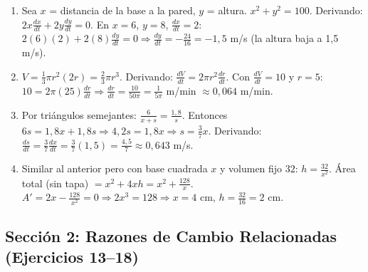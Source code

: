 \documentclass[12pt, letterpaper]{article}
\begin{document}
\begin{enumerate}[series=respuestas, leftmargin=*, label=\textbf{\arabic*.}]
    \item Sea $x$ = distancia de la base a la pared, $y$ = altura. $x^2 + y^2 = 100$. Derivando: $2x\frac{dx}{dt} + 2y\frac{dy}{dt} = 0$. En $x = 6$, $y = 8$, $\frac{dx}{dt} = 2$: $2(6)(2) + 2(8)\frac{dy}{dt} = 0 \Rightarrow \frac{dy}{dt} = -\frac{24}{16} = -1{,}5$ m/s (la altura baja a 1,5 m/s).
    \item $V = \frac{1}{3}\pi r^2(2r) = \frac{2}{3}\pi r^3$. Derivando: $\frac{dV}{dt} = 2\pi r^2 \frac{dr}{dt}$. Con $\frac{dV}{dt} = 10$ y $r = 5$: $10 = 2\pi(25)\frac{dr}{dt} \Rightarrow \frac{dr}{dt} = \frac{10}{50\pi} = \frac{1}{5\pi}$ m/min $\approx 0{,}064$ m/min.
    \item Por triángulos semejantes: $\frac{6}{x + s} = \frac{1{,}8}{s}$. Entonces $6s = 1{,}8x + 1{,}8s \Rightarrow 4{,}2s = 1{,}8x \Rightarrow s = \frac{3}{7}x$. Derivando: $\frac{ds}{dt} = \frac{3}{7}\frac{dx}{dt} = \frac{3}{7}(1{,}5) = \frac{4{,}5}{7} \approx 0{,}643$ m/s.
    \item Similar al anterior pero con base cuadrada $x$ y volumen fijo $32$: $h = \frac{32}{x^2}$. Área total (sin tapa) $= x^2 + 4xh = x^2 + \frac{128}{x}$. $A' = 2x - \frac{128}{x^2} = 0 \Rightarrow 2x^3 = 128 \Rightarrow x = 4$ cm, $h = \frac{32}{16} = 2$ cm.
  \end{enumerate}


  \subsection*{Sección 2: Razones de Cambio Relacionadas (Ejercicios 13--18)}
\end{document}
